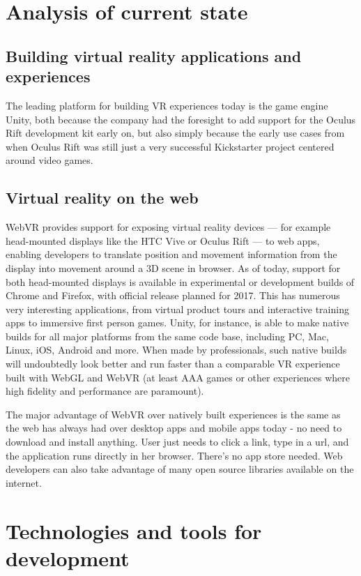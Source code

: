\section{Analysis of current state}

\subsection{Building virtual reality applications and experiences}

The leading platform for building VR experiences today is the game engine Unity, both because the company had the foresight to add support for the Oculus Rift development kit early on, but also simply because the early use cases from when Oculus Rift was still just a very successful Kickstarter project centered around video games. 

\subsection{Virtual reality on the web}

WebVR provides support for exposing virtual reality devices — for example head-mounted displays like the HTC Vive or Oculus Rift — to web apps, enabling developers to translate position and movement information from the display into movement around a 3D scene in browser. As of today, support for both head-mounted displays is available in experimental or development builds of Chrome and Firefox, with official release planned for 2017. This has numerous very interesting applications, from virtual product tours and interactive training apps to immersive first person games.
Unity, for instance, is able to make native builds for all major platforms from the same code base, including PC, Mac, Linux, iOS, Android and more. When made by professionals, such native builds will undoubtedly look better and run faster than a comparable VR experience built with WebGL and WebVR (at least AAA games or other experiences where high fidelity and performance are paramount).

The major advantage of WebVR over natively built experiences is the same as the web has always had over desktop apps and mobile apps today - no need to download and install anything. User just needs to click a link, type in a url, and the application runs directly in her browser. There’s no app store needed. Web developers can also take advantage of many open source libraries available on the internet.

\section{Technologies and tools for development}
